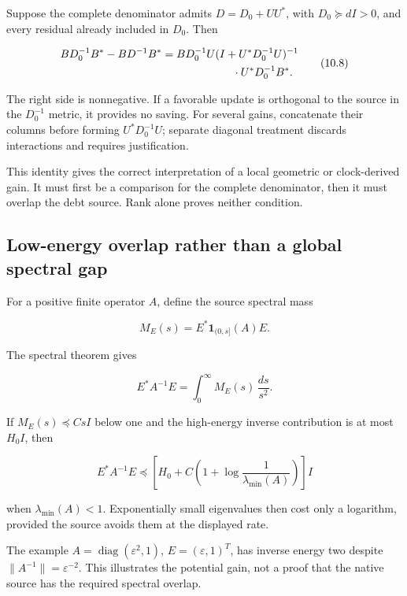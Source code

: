 \documentclass[
  10pt,
  a4paper,
  10pt,
  oneside,
  openany]{book}
\begin{document}
Suppose the complete denominator admits \(D=D_0+UU^*\), with
\(D_0\succeq dI>0\), and every residual already included in \(D_0\).
Then

\[
\begin{aligned}
BD_0^{-1}B^*-BD^{-1}B^*
={}&BD_0^{-1}U(I+U^*D_0^{-1}U)^{-1}\\
&\hspace{18mm}\cdot U^*D_0^{-1}B^*.
\end{aligned}
\tag{10.8}\label{eq:10.8}
\]

The right side is nonnegative. If a favorable update is orthogonal to
the source in the \(D_0^{-1}\) metric, it provides no saving. For
several gains, concatenate their columns before forming
\(U^*D_0^{-1}U\); separate diagonal treatment discards interactions and
requires justification.

This identity gives the correct interpretation of a local geometric or
clock-derived gain. It must first be a comparison for the complete
denominator, then it must overlap the debt source. Rank alone proves
neither condition.

\subsection{Low-energy overlap rather than a global spectral
gap}\label{low-energy-overlap-rather-than-a-global-spectral-gap}

For a positive finite operator \(A\), define the source spectral mass

\[
M_E(s)=E^*\mathbf1_{(0,s]}(A)E.
\tag{10.9}\label{eq:10.9}
\]

The spectral theorem gives

\[
E^*A^{-1}E=\int_0^\infty M_E(s)\,\frac{ds}{s^2}.
\tag{10.10}\label{eq:10.10}
\]

If \(M_E(s)\preceq CsI\) below one and the high-energy inverse
contribution is at most \(H_0I\), then

\[
E^*A^{-1}E
\preceq\left[H_0+C\left(1+\log\frac1{\lambda_{\min}(A)}\right)\right]I
\tag{10.11}\label{eq:10.11}
\]

when \(\lambda_{\min}(A)<1\). Exponentially small eigenvalues then cost
only a logarithm, provided the source avoids them at the displayed rate.

The example \(A=\operatorname{diag}(\varepsilon^2,1)\),
\(E=(\varepsilon,1)^T\), has inverse energy two despite
\(\|A^{-1}\|=\varepsilon^{-2}\). This illustrates the potential gain,
not a proof that the native source has the required spectral overlap.
\end{document}
